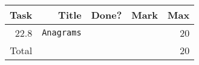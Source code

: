 \newcommand{\class}[1]{\texttt{#1}}
\newcommand{\interface}[1]{\texttt{#1}}
\newcommand{\method}[2]{\texttt{#2()}}
\newcommand{\methodnoclass}[1]{\texttt{#1()}}
\\ \\ \\ \noindent\parbox[l]{\textwidth}{
 \\ \\
\begin{tabular}{||r|r|r|r|r||} \hline \hline
Task  & Title                            & Done? & Mark & Max \\ \hline
22.8 & \class{Anagrams} & & & 20 \\ \hline
\hline
Total &                                  &       &      & 20 \\ \hline
\hline
\end{tabular} \\ \\
}
